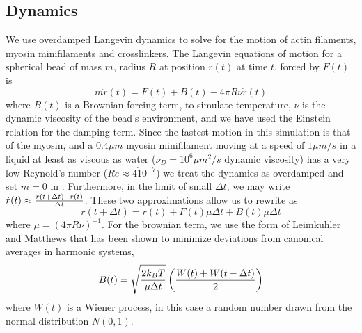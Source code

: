 \documentclass[12pt]{article}
\begin{document}
\subsection{Dynamics}
We use overdamped Langevin dynamics to solve for the motion of actin filaments, myosin minifilaments and crosslinkers.
The Langevin equations of motion for a spherical bead of
mass $m$, radius $R$ at position $r(t)$ at time $t$, forced by $F(t)$ is
\begin{equation}
  m\ddot{r}(t) = F(t) + B(t) - 4\pi R\nu \dot{r}(t)
  \label{eqn:lang}
\end{equation}  
where $B(t)$ is a Brownian forcing term, to simulate temperature, $\nu$ is the dynamic viscosity of the bead's
environment, and we have used the Einstein relation for the damping term.  
Since the fastest motion in this simulation is that of the myosin, and a $0.4\mu m$ myosin minifilament moving at
a speed of $1\mu m/s$ in a liquid at least as viscous as water ($\nu_D=10^6\mu m^2/s$ dynamic viscosity) has a very low Reynold's
number ($Re \approx 4\dot10^{-7}$) we treat the dynamics as overdamped and set $m=0$ in .
Furthermore, in the limit of small $\Delta t$, we may write $\dot{r}(t) \approx {r(t+\Delta t)-r(t)\over \Delta t}$. These two
approximations allow us to rewrite  as 
\begin{equation}   
  r(t+\Delta t) = r(t) + F(t)\mu \Delta t + B(t) \mu \Delta t
  \label{eqn:overdamped}
\end{equation}
where $\mu = (4\pi R\nu)^{-1}$. For the brownian term, we use the form of Leimkuhler and Matthews \cite{leimkuhler2013} that has
been shown to minimize deviations from canonical averages in harmonic systems,
\begin{equation}
  B(t)=\sqrt{2k_BT\over\mu \Delta t}\left({W(t)+W(t-\Delta t)\over2}\right)
  \label{eqn:baoab_brownian}
\end{equation} 
where $W(t)$ is a Wiener process, in this case a random number drawn from the normal distribution $N(0,1)$. 
\end{document}
